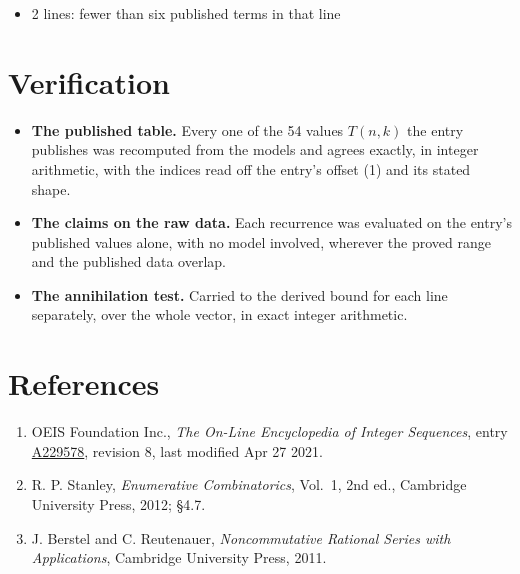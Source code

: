 \documentclass[11pt]{article}
\theoremstyle{definition}
\begin{document}
\begin{itemize}

\item 2 lines: fewer than six published terms in that line

\end{itemize}

\section{Verification}

\begin{itemize}

\item {\bfseries The published table.} Every one of the 54 values $T(n,k)$ the entry publishes was recomputed from the models and agrees exactly, in integer arithmetic, with the indices read off the entry's offset (1) and its stated shape.

\item {\bfseries The claims on the raw data.} Each recurrence was evaluated on the entry's published values alone, with no model involved, wherever the proved range and the published data overlap.

\item {\bfseries The annihilation test.} Carried to the derived bound for each line separately, over the whole vector, in exact integer arithmetic.

\end{itemize}

\section{References}

\begin{enumerate}

\item OEIS Foundation Inc., \emph{The On-Line Encyclopedia of Integer Sequences}, entry \href{https://oeis.org/A229578}{A229578}, revision 8, last modified Apr 27 2021.

\item R. P. Stanley, \emph{Enumerative Combinatorics}, Vol.~1, 2nd ed., Cambridge University Press, 2012; \S4.7.

\item J. Berstel and C. Reutenauer, \emph{Noncommutative Rational Series with Applications}, Cambridge University Press, 2011.

\end{enumerate}
\end{document}
